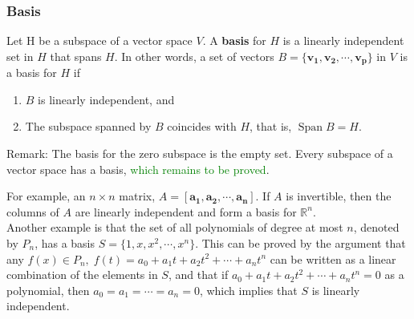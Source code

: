 \documentclass[10pt, a4paper]{article}
\newcommand{\R}{\mathbb{R}}
\newcommand{\vt}[1]{\mathbf{#1}}
\begin{document}
\subsubsection*{Basis}
\begin{definition}
    Let H be a subspace of a vector space $V$. A \textbf{basis} for $H$ is a linearly independent set in $H$ that spans $H$. In other words, a set of vectors $B=\{\mathbf{v_1}, \mathbf{v_2}, \cdots, \mathbf{v_p}\}$ in $V$ is a basis for $H$ if
    \begin{enumerate}
        \item $B$ is linearly independent, and
        \item The subspace spanned by $B$ coincides with $H$, that is, $\operatorname*{Span}B = H$.
    \end{enumerate}
    Remark: The basis for the zero subspace is the empty set. Every subspace of a vector space has a basis, \textcolor{Green}{which remains to be proved}.
\end{definition}
\indent For example, an $n\times n$ matrix, $A=[\vt{a_1}, \vt{a_2}, \cdots, \vt{a_n}]$. If $A$ is invertible, then the columns of $A$ are linearly independent and form a basis for $\R^n$.\\
\indent Another example is that the set of all polynomials of degree at most $n$, denoted by $P_n$, has a basis $S=\{1, x, x^2, \cdots, x^n\}$. This can be proved by the argument that
any $f(x)\in P_n, \; f(t) = a_0 + a_1t + a_2t^2 + \cdots + a_nt^n$ can be written as a linear combination of the elements in $S$, and that if $a_0 + a_1t + a_2t^2 + \cdots + a_nt^n = 0$ as a polynomial, then $a_0 = a_1 = \cdots = a_n = 0$, which implies that $S$ is linearly independent.\\
\end{document}
